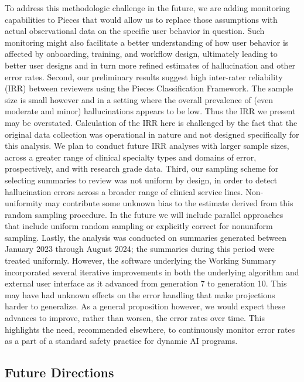 \documentclass{style/myclass}
\begin{document}
To address this methodologic challenge in the future, we are adding monitoring capabilities to Pieces that would allow us to replace those assumptions with actual observational data on the specific user behavior in question. Such monitoring might also facilitate a better understanding of how user behavior is affected by onboarding, training, and workflow design, ultimately leading to better user designs and in turn more refined estimates of hallucination and other error rates. Second, our preliminary results suggest high inter-rater reliability (IRR) between reviewers using the Pieces Classification Framework. The sample size is small however and in a setting where the overall prevalence of (even moderate and minor) hallucinations appears to be low. Thus the IRR we present may be overstated. Calculation of the IRR here is challenged by the fact that the original data collection was operational in nature and not designed specifically for this analysis. We plan to conduct future IRR analyses with larger sample sizes, across a greater range of clinical specialty types and domains of error, prospectively, and with research grade data. Third, our sampling scheme for selecting summaries to review was not uniform by design, in order to detect hallucination errors across a broader range of clinical service lines. Non-uniformity may contribute some unknown bias to the estimate derived from this random sampling procedure. In the future we will include parallel approaches that include uniform random sampling or explicitly correct for nonuniform sampling. Lastly, the analysis was conducted on summaries generated between January 2023 through August 2024; the summaries during this period were treated uniformly. However, the software underlying the Working Summary incorporated several iterative improvements in both the underlying algorithm and external user interface as it advanced from generation 7 to generation 10. This may have had unknown effects on the error handling that make projections harder to generalize. As a general proposition however, we would expect these advances to improve, rather than worsen, the error rates over time. This highlights the need, recommended elsewhere, to continuously monitor error rates as a part of a standard safety practice for dynamic AI programs. \cite{22}

\subsection{Future Directions}
\end{document}
